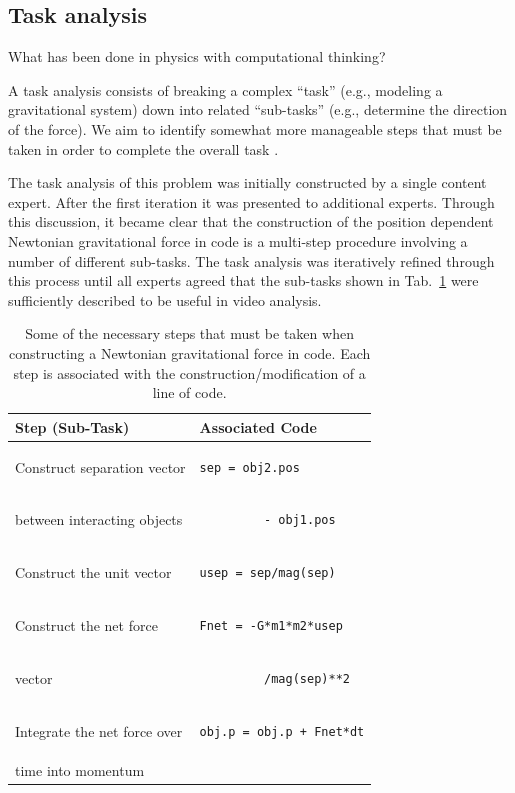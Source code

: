 \documentclass{msuphddissertation}
\begin{document}
\begin{doublespace}
\section{Task analysis}

What has been done in physics with computational thinking?

A task analysis consists of breaking a complex ``task'' (e.g., modeling a gravitational system) down into related ``sub-tasks'' (e.g., determine the direction of the force). We aim to identify somewhat more manageable steps that must be taken in order to complete the overall task \cite{Catrambone1998}.

The task analysis of this problem was initially constructed by a single content expert. After the first iteration it was presented to additional experts. Through this discussion, it became clear that the construction of the position dependent Newtonian gravitational force in code is a multi-step procedure involving a number of different sub-tasks. The task analysis was iteratively refined through this process until all experts agreed that the sub-tasks shown in Tab.~\ref{CH3:TaskAnalysis} were sufficiently described to be useful in video analysis.

\begin{table}[hb]\centering
\begin{tabular}{ll}
\textbf{Step (Sub-Task)} & \textbf{Associated Code} \\\hline
Construct separation vector & \begin{lstlisting}
sep = obj2.pos
\end{lstlisting}\\
between interacting objects & \begin{lstlisting}
         - obj1.pos
\end{lstlisting}\\\hline
Construct the unit vector & \begin{lstlisting}
usep = sep/mag(sep)
\end{lstlisting}\\\hline
Construct the net force & \begin{lstlisting}
Fnet = -G*m1*m2*usep
\end{lstlisting}\\
vector & \begin{lstlisting}
         /mag(sep)**2
\end{lstlisting}\\\hline
Integrate the net force over & \begin{lstlisting}
obj.p = obj.p + Fnet*dt
\end{lstlisting}\\
time into momentum & \\
\end{tabular}\caption{Some of the necessary steps that must be taken when constructing a Newtonian gravitational force in code.  Each step is associated with the construction/modification of a line of code.\label{CH3:TaskAnalysis}}
\end{table}
 

\end{doublespace}
\end{document}
